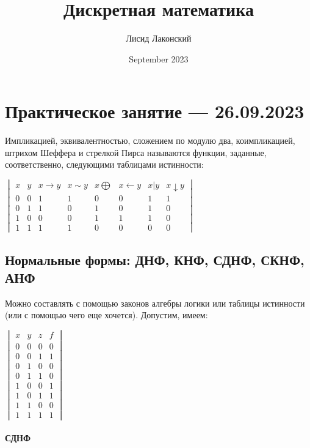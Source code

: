 \documentclass{article}
\title{Дискретная математика}
\author{Лисид Лаконский}
\date{September 2023}
\begin{document}
\raggedright

\maketitle

\tableofcontents
\pagebreak

\section{Практическое занятие — 26.09.2023}

Импликацией, эквивалентностью, сложением по модулю два, коимпликацией, штрихом Шеффера и стрелкой Пирса называются функции, заданные, соответственно, следующими таблицами истинности:

$\begin{vmatrix}
    x & y & x \rightarrow y & x \sim y & x \bigoplus & x \leftarrow y & x | y & x \downarrow y \\
    0 & 0 & 1 & 1 & 0 & 0 & 1 & 1 \\
    0 & 1 & 1 & 0 & 1 & 0 & 1 & 0 \\
    1 & 0 & 0 & 0 & 1 & 1 & 1 & 0 \\
    1 & 1 & 1 & 1 & 0 & 0 & 0 & 0
\end{vmatrix}$

\subsection{Нормальные формы: ДНФ, КНФ, СДНФ, СКНФ, АНФ}

Можно составлять с помощью законов алгебры логики или таблицы истинности (или с помощью чего еще хочется). Допустим, имеем:

$\begin{vmatrix}
    x & y & z & f \\
    0 & 0 & 0 & 0 \\
    0 & 0 & 1 & 1 \\
    0 & 1 & 0 & 0 \\
    0 & 1 & 1 & 0 \\
    1 & 0 & 0 & 1 \\
    1 & 0 & 1 & 1 \\
    1 & 1 & 0 & 0 \\
    1 & 1 & 1 & 1
\end{vmatrix}$

\paragraph{СДНФ}
\end{document}

